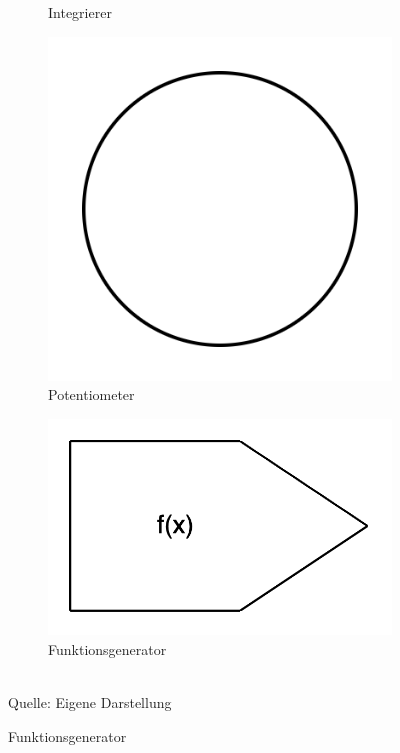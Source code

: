 \begin{figure}[h]
\begin{subfigure}[b]{0.2\textwidth}
    \caption{Integrierer}
  \end{subfigure}%
  \hfill
  \begin{subfigure}[b]{0.2\textwidth}
    \includegraphics[width=\textwidth]{abbildungen/symbol_potentiometer.png}
    \caption{Potentiometer}
  \end{subfigure}%
  \hfill
  \begin{subfigure}[b]{0.2\textwidth}
    \includegraphics[width=\textwidth]{abbildungen/symbol_funktionsgenerator.png}
    \caption{Funktionsgenerator}
  \end{subfigure}
  \\
  Quelle: Eigene Darstellung
  \label{fig:Symbole analoger Computer}
\end{figure}

